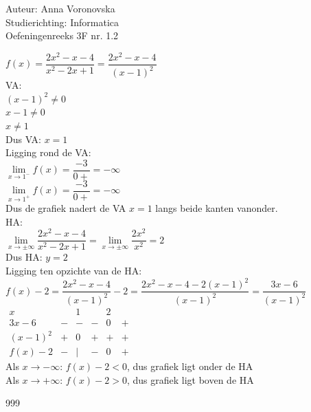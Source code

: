 \documentclass[a4paper]{article}
\begin{document}
  
\noindent \large Auteur: Anna Voronovska \\
\noindent \large Studierichting: Informatica\\
\noindent \large Oefeningenreeks 3F nr. 1.2\\

\medskip

\normalsize

$f(x) = \dfrac{2x^2 - x - 4}{x^2 - 2x + 1} = \dfrac{2x^2 - x - 4}{(x - 1)^2}$\\

VA:\\

$(x-1)^2 \neq 0$\\

$x-1 \neq 0$\\

$x \neq 1$\\

Dus VA: $x = 1$\\

Ligging rond de VA:\\

$\lim\limits_{x \to 1^{-}} f(x) = \dfrac{-3}{0+} = -\infty$\\

$\lim\limits_{x \to 1^{+}} f(x) = \dfrac{-3}{0+} = -\infty$\\

Dus de grafiek nadert de VA $x = 1$ langs beide kanten vanonder.\\

HA:\\

$\lim\limits_{x \to \pm\infty} \dfrac{2x^2 - x - 4}{x^2 - 2x + 1} = \lim\limits_{x \to \pm\infty} \dfrac{2x^2}{x^2} = 2$\\

Dus HA: $y = 2$\\

Ligging ten opzichte van de HA:\\

$f(x) - 2 = \dfrac{2x^2 - x - 4}{(x-1)^2} - 2 = \dfrac{2x^2 - x - 4 - 2(x-1)^2}{(x-1)^2} = \dfrac{3x - 6}{(x-1)^2}$\\

$\begin{array}{c|ccccc}
    x         &   & 1     &   & 2 &  \\ \hline
    3x - 6    & - & -     & - & 0 & + \\
    (x - 1)^2 & + & 0     & + & + & + \\ \hline
    f(x) - 2  & - & \vert & - & 0 & +
\end{array}$\\

Als $x \to -\infty$: $f(x) - 2 < 0$, dus grafiek ligt onder de HA\\

Als $x \to +\infty$: $f(x) - 2 > 0$, dus grafiek ligt boven de HA\\


\begin{thebibliography}{999}
\end{thebibliography}
\end{document}
